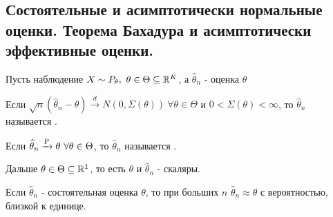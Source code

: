 \subsection{Состоятельные и асимптотически нормальные оценки. Теорема Бахадура и асимптотически эффективные оценки.}
Пусть наблюдение \(X \sim  P_{\theta},\ \theta \in \Theta \subseteq \R^{K}\), а \(\widehat{\theta}_n\) - оценка \(\theta\)
\begin{definition}
    Если \(\sqrt{n}(\widehat{\theta}_n - \theta) \xrightarrow{d} N(0, \Sigma(\theta)) \ \forall \theta \in \Theta\)
    и \(0 < \Sigma(\theta) < \infty\), то \(\widehat{\theta}_n\) называется .
\end{definition}
\begin{definition}
    Если \(\widehat{\theta}_n \xrightarrow{\P} \theta \ \forall \theta \in \Theta\), то \(\widehat{\theta}_n\) называется .
\end{definition}
\begin{remark}
    Дальше \(\theta \in \Theta \subseteq \R^1\), то есть \(\theta\) и \(\widehat{\theta}_n\) - скаляры.
\end{remark}

Если \(\widehat{\theta}_n\) - состоятельная оценка \(\theta\), то при больших \(n\) \(\widehat{\theta}_n \approx \theta\) с вероятностью, близкой к единице.

